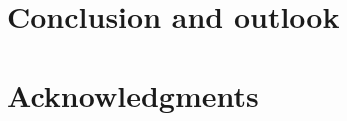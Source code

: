 \documentclass[11pt,a4paper]{article}
\begin{document}
\section{Conclusion and outlook \label{sec:discussion}}
\section*{Acknowledgments}


\end{document}
